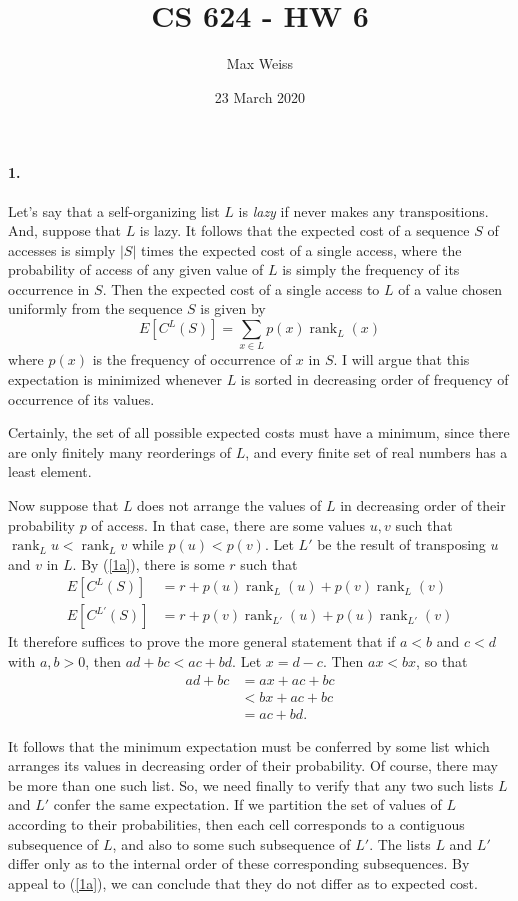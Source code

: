 \documentclass[
]{article}
\date{23 March 2020}
\title{CS 624 - HW 6}
\author{Max Weiss}
\DeclareMathOperator{\rank}{rank}
\begin{document}
\maketitle

\paragraph{1.} Let's say that a self-organizing list $L$ is \emph{lazy} if never makes any transpositions.  And, suppose that $L$ is lazy.  It follows that the expected cost of a sequence $S$ of accesses is simply $|S|$ times the expected cost of a single access, where the probability of access of any given value of $L$ is simply the frequency of its occurrence in $S$. Then the expected cost of a single access to $L$ of a value chosen uniformly from the sequence $S$ is given by
\begin{equation}
\label{1a}
E[C^L(S)] = \sum_{x\in L}p(x)\rank_L(x)
\end{equation}
where $p(x)$ is the frequency of occurrence of $x$ in $S$.  I will argue that this expectation is minimized whenever $L$ is sorted in decreasing order of frequency of occurrence of its values.

Certainly, the set of all possible expected costs must have a minimum, since there are only finitely many reorderings of $L$, and every finite set of real numbers has a least element.

Now suppose that $L$ does not arrange the values of $L$ in decreasing order of their probability $p$ of access.  In that case, there are some values $u,v$ such that $\rank_{L}{u}<\rank_{L}{v}$ while $p(u)<p(v)$.  Let $L'$ be the result of transposing $u$ and $v$ in $L$. By (\ref{1a}), there is some $r$ such that
\begin{align*}
  E[C^{L}(S)] &= r + p(u)\rank_{L}(u) + p(v)\rank_{L}(v)\\
  E[C^{L'}(S)] &= r + p(v)\rank_{L'}(u) + p(u)\rank_{L'}(v)
\end{align*}
It therefore suffices to prove the more general statement that if $a<b$ and $c<d$ with $a,b> 0$, then $ad+bc<ac+bd$.  Let $x=d-c$.  Then $ax<bx$, so that
\begin{align*}
  ad + bc &= ax + ac + bc\\
  &<
  bx + ac + bc\\
  &=
  ac + bd.
\end{align*}

It follows that the minimum expectation must be conferred by some list which arranges its values in decreasing order of their probability.  Of course, there may be more than one such list.  So, we need finally to verify that any two such lists $L$ and $L'$ confer the same expectation.  If we partition the set of values of $L$ according to their probabilities, then each cell corresponds to a contiguous subsequence of $L$, and also to some such subsequence of $L'$.  The lists $L$ and $L'$ differ only as to the internal order of these corresponding subsequences.  By appeal to (\ref{1a}), we can conclude that they do not differ as to expected cost.
\end{document}
